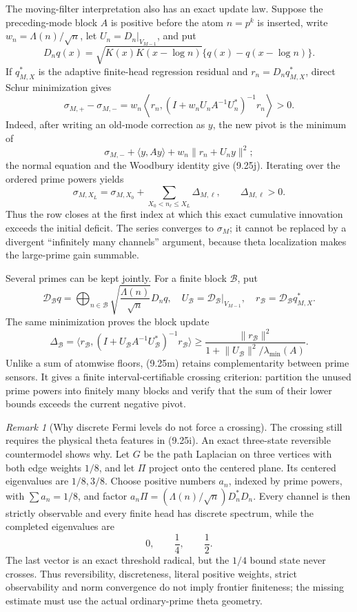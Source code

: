 \documentclass[11pt]{amsart}
\theoremstyle{definition}
\theoremstyle{remark}
\newtheorem{remark}[theorem]{Remark}
\begin{document}
The moving-filter interpretation also has an exact update law.  Suppose
the preceding-mode block \(A\) is positive before the atom
\(n=p^k\) is inserted, write \(w_n=\Lambda(n)/\sqrt n\), let
\(U_n=D_n|_{V_{M-1}}\), and put
\[
 D_nq(x)=\sqrt{K(x)K(x-\log n)}
          \{q(x)-q(x-\log n)\}.
\tag{9.25i}
\]
If \(q_{M,X}^*\) is the adaptive finite-head regression residual and
\(r_n=D_nq_{M,X}^*\), direct Schur minimization gives
\[
 \boxed{
 \sigma_{M,+}-\sigma_{M,-}
 =w_n\left\langle r_n,
 (I+w_nU_nA^{-1}U_n^*)^{-1}r_n\right\rangle>0.}
\tag{9.25j}
\]
Indeed, after writing an old-mode correction as \(y\), the new pivot is
the minimum of
\[
 \sigma_{M,-}+\langle y,Ay\rangle
 +w_n\lVert r_n+U_ny\rVert^2;
\]
the normal equation and the Woodbury identity give (9.25j).  Iterating
over the ordered prime powers yields
\[
 \sigma_{M,X_L}=\sigma_{M,X_0}
 +\sum_{X_0<n_\ell\le X_L}\Delta_{M,\ell},
 \qquad \Delta_{M,\ell}>0.
\tag{9.25k}
\]
Thus the row closes at the first index at which this exact cumulative
innovation exceeds the initial deficit.  The series converges to
\(\sigma_M\); it cannot be replaced by a divergent ``infinitely many
channels'' argument, because theta localization makes the large-prime
gain summable.

Several primes can be kept jointly.  For a finite block \(\mathcal B\),
put
\[
 \mathcal D_{\mathcal B}q
 =\bigoplus_{n\in\mathcal B}\sqrt{\frac{\Lambda(n)}{\sqrt n}}D_nq,
 \quad U_{\mathcal B}=\mathcal D_{\mathcal B}|_{V_{M-1}},
 \quad r_{\mathcal B}=\mathcal D_{\mathcal B}q_{M,X}^*.
\tag{9.25l}
\]
The same minimization proves the block update
\[
 \Delta_{\mathcal B}
 =\langle r_{\mathcal B},
 (I+U_{\mathcal B}A^{-1}U_{\mathcal B}^*)^{-1}
 r_{\mathcal B}\rangle
 \ge\frac{\lVert r_{\mathcal B}\rVert^2}
 {1+\lVert U_{\mathcal B}\rVert^2/\lambda_{\min}(A)}.
\tag{9.25m}
\]
Unlike a sum of atomwise floors, (9.25m) retains complementarity between
prime sensors.  It gives a finite interval-certifiable crossing criterion:
partition the unused prime powers into finitely many blocks and verify that
the sum of their lower bounds exceeds the current negative pivot.

\begin{remark}[Why discrete Fermi levels do not force a crossing]
The crossing still requires the physical theta features in (9.25i).  An
exact three-state reversible countermodel shows why.  Let \(G\) be the
path Laplacian on three vertices with both edge weights \(1/8\), and let
\(\Pi\) project onto the centered plane.  Its centered eigenvalues are
\(1/8,3/8\).  Choose positive numbers \(a_n\), indexed by prime powers,
with \(\sum a_n=1/8\), and factor
\(a_n\Pi=(\Lambda(n)/\sqrt n)D_n^*D_n\).  Every channel is then strictly
observable and every finite head has discrete spectrum, while the
completed eigenvalues are
\[
 0,\qquad\frac14,\qquad\frac12.
\tag{9.25n}
\]
The last vector is an exact threshold radical, but the \(1/4\) bound state
never crosses.  Thus reversibility, discreteness, literal positive weights,
strict observability and norm convergence do not imply frontier finiteness;
the missing estimate must use the actual ordinary-prime theta geometry.
\end{remark}
\end{document}
